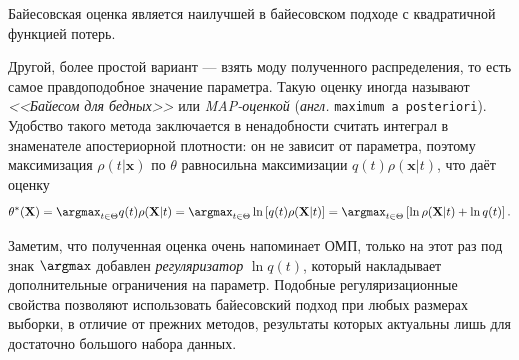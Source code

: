 \begin{theorem}[label=bayes_is_the_best]{}{}
    Байесовская оценка является наилучшей в байесовском подходе с квадратичной функцией потерь.
\end{theorem}

Другой, более простой вариант --- взять моду полученного распределения, то есть самое правдоподобное значение параметра. Такую оценку иногда называют \textit{<<Байесом для бедных>>} или \textit{MAP-оценкой} (\textit{англ.} \texttt{maximum a posteriori}). Удобство такого метода заключается в ненадобности считать интеграл в знаменателе апостериорной плотности: он не зависит от параметра, поэтому максимизация $\rho(t | \mathbf{x})$ по $\theta$ равносильна максимизации $q(t) \rho(\mathbf{x} | t)$, что даёт оценку
\[
\theta^*(\mathbf X) = \argmax_{t \in \Theta} q(t) \rho(\mathbf{X} | t) = \argmax_{t \in \Theta} \ln{\left[q(t) \rho(\mathbf{X} | t)\right]} = \argmax_{t \in \Theta} \left[\ln{\rho(\mathbf{X} | t)} + \ln{q(t)}\right].
\]

Заметим, что полученная оценка очень напоминает ОМП, только на этот раз под знак $\argmax$ добавлен \textit{регуляризатор} $\ln{q(t)}$, который накладывает дополнительные ограничения на параметр. Подобные регуляризационные свойства позволяют использовать байесовский подход при любых размерах выборки, в отличие от прежних методов, результаты которых актуальны лишь для достаточно большого набора данных.

